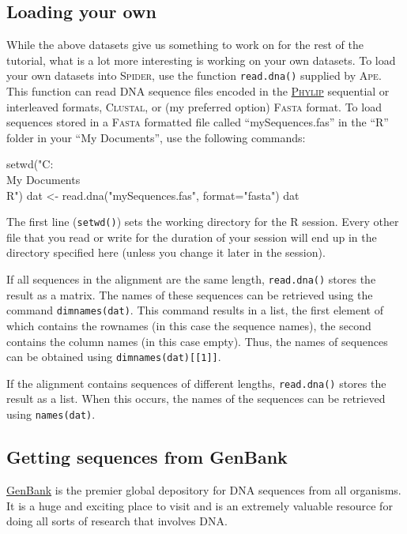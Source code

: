 \documentclass{article}
\newcommand{\Spider}{\textsc{Spider}} %
\newcommand{\progname}[1]{\textsc{#1}}
\newcommand{\fun}[1]{\texttt{#1}}
\begin{document}
\subsection{Loading your own}
While the above datasets give us something to work on for the rest of the tutorial, what is a lot more interesting is working on your own datasets. To load your own datasets into \Spider, use the function \fun{read.dna()} supplied by \progname{Ape}. This function can read DNA sequence files encoded in the \href{http://cmgm.stanford.edu/phylip/formats.html#6}{\progname{Phylip}} sequential or interleaved formats, \progname{Clustal}, or (my preferred option) \progname{Fasta} format. To load sequences stored in a \progname{Fasta} formatted file called ``mySequences.fas'' in the ``R'' folder in your ``My Documents'', use the following commands:

\begin{console}
setwd("C:\\My Documents\\R")
dat <- read.dna("mySequences.fas", format="fasta")
dat
\end{console}

The first line (\fun{setwd()}) sets the working directory for the \progname{R} session. Every other file that you read or write for the duration of your session will end up in the directory specified here (unless you change it later in the session).

If all sequences in the alignment are the same length, \fun{read.dna()} stores the result as a matrix. The names of these sequences can be retrieved using the command \fun{dimnames(dat)}. This command results in a list, the first element of which contains the rownames (in this case the sequence names), the second contains the column names (in this case empty). Thus, the names of sequences can be obtained using \fun{dimnames(dat)[[1]]}.

If the alignment contains sequences of different lengths, \fun{read.dna()} stores the result as a list. When this occurs, the names of the sequences can be retrieved using \fun{names(dat)}. 

\subsection{Getting sequences from GenBank}
\href{http://www.ncbi.nlm.nih.gov/nuccore}{GenBank} is the premier global depository for DNA sequences from all organisms. It is a huge and exciting place to visit and is an extremely valuable resource for doing all sorts of research that involves DNA. 
\end{document}
